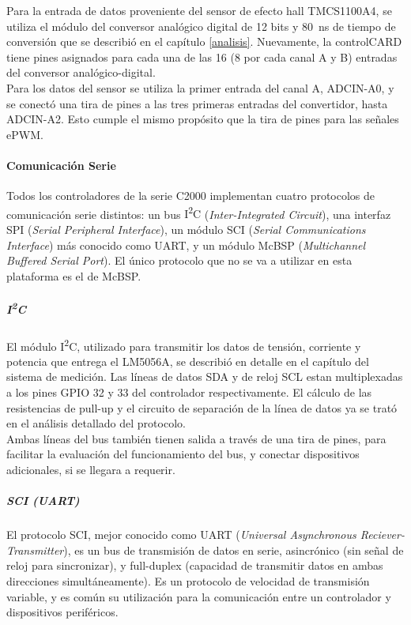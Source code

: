 Para la entrada de datos proveniente del sensor de efecto hall TMCS1100A4, se utiliza el módulo del conversor analógico digital de 12 bits y \SI[]{80}{\nano\second} de tiempo de conversión que se describió en el capítulo \ref{analisis}. Nuevamente, la controlCARD tiene pines asignados para cada una de las 16 (8 por cada canal A y B) entradas del conversor analógico-digital.\\

Para los datos del sensor se utiliza la primer entrada del canal A, ADCIN-A0, y se conectó una tira de pines a las tres primeras entradas del convertidor, hasta ADCIN-A2. Esto cumple el mismo propósito que la tira de pines para las señales ePWM.\\

\paragraph{Comunicación Serie}

Todos los controladores de la serie C2000 implementan cuatro protocolos de comunicación serie distintos: un bus {\Medium I\textsuperscript{2}C} (\textit{Inter-Integrated Circuit}), una interfaz {\Medium SPI} (\textit{Serial Peripheral Interface}), un módulo {\Medium SCI} (\textit{Serial Communications Interface}) más conocido como UART, y un módulo {\Medium McBSP} (\textit{Multichannel Buffered Serial Port}). El único protocolo que no se va a utilizar en esta plataforma es el de McBSP.\\

\subparagraph{I\textsuperscript{2}C}

El módulo I\textsuperscript{2}C, utilizado para transmitir los datos de tensión, corriente y potencia que entrega el LM5056A, se describió en detalle en el capítulo del sistema de medición. Las líneas de datos SDA y de reloj SCL estan multiplexadas a los pines GPIO 32 y 33 del controlador respectivamente. El cálculo de las resistencias de pull-up y el circuito de separación de la línea de datos ya se trató en el análisis detallado del protocolo.\\

Ambas líneas del bus también tienen salida a través de una tira de pines, para facilitar la evaluación del funcionamiento del bus, y conectar dispositivos adicionales, si se llegara a requerir.\\

\subparagraph{SCI (UART)}

El protocolo SCI, mejor conocido como UART (\textit{Universal Asynchronous Reciever-Transmitter}), es un bus de transmisión de datos en serie, asincrónico (sin señal de reloj para sincronizar), y full-duplex (capacidad de transmitir datos en ambas direcciones simultáneamente). Es un protocolo de velocidad de transmisión variable, y es común su utilización para la comunicación entre un controlador y dispositivos periféricos.\\


